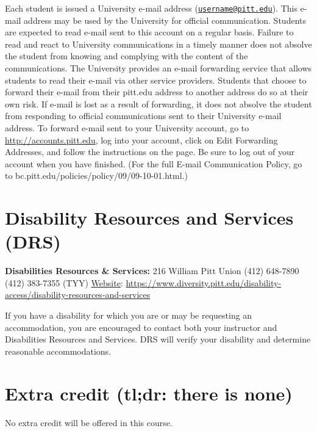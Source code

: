 \documentclass[
]{book}
\begin{document}
Each student is issued a University e-mail address (\href{mailto:username@pitt.edu}{\nolinkurl{username@pitt.edu}}). This e-mail address may be used by the University for official communication. Students are expected to read e-mail sent to this account on a regular basis. Failure to read and react to University communications in a timely manner does not absolve the student from knowing and complying with the content of the communications. The University provides an e-mail forwarding service that allows students to read their e-mail via other service providers. Students that choose to forward their e-mail from their pitt.edu address to another address do so at their own risk. If e-mail is lost as a result of forwarding, it does not absolve the student from responding to official communications sent to their University e-mail address. To forward e-mail sent to your University account, go to \url{http://accounts.pitt.edu}, log into your account, click on Edit Forwarding Addresses, and follow the instructions on the page. Be sure to log out of your account when you have finished. (For the full E-mail Communication Policy, go to bc.pitt.edu/policies/policy/09/09-10-01.html.)

\hypertarget{disability-resources-and-services-drs}{%
\chapter{Disability Resources and Services (DRS)}\label{disability-resources-and-services-drs}}

\textbf{Disabilities Resources \& Services:}
216 William Pitt Union
(412) 648-7890
(412) 383-7355 (TYY)
\href{https://www.diversity.pitt.edu/disability-access/disability-resources-and-services}{Website}: \url{https://www.diversity.pitt.edu/disability-access/disability-resources-and-services}

If you have a disability for which you are or may be requesting an accommodation, you are encouraged to contact both your instructor and Disabilities Resources and Services. DRS will verify your disability and determine reasonable accommodations.

\hypertarget{extra-credit-tldr-there-is-none}{%
\chapter{Extra credit (tl;dr: there is none)}\label{extra-credit-tldr-there-is-none}}

No extra credit will be offered in this course.
\end{document}
